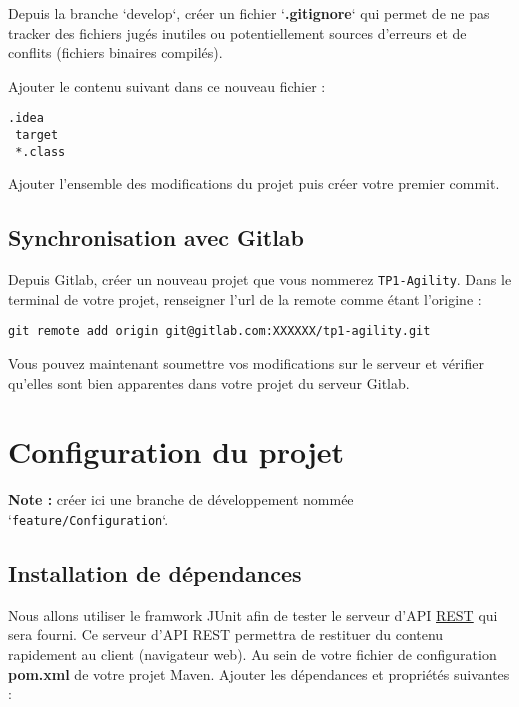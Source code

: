 \documentclass[11pt,a4paper,oneside]{article}
\begin{document}
Depuis la branche `develop`, créer un fichier `\textbf{.gitignore}` qui permet de ne pas tracker des fichiers jugés inutiles ou potentiellement sources d'erreurs et de conflits (fichiers binaires compilés).

\vspace{5mm}
Ajouter le contenu suivant dans ce nouveau fichier :

\begin{lstlisting}[style=custombash]
 .idea
 target
 *.class
\end{lstlisting}

Ajouter l'ensemble des modifications du projet puis créer votre premier commit.


\subsection{Synchronisation avec Gitlab}

Depuis Gitlab, créer un nouveau projet que vous nommerez \texttt{TP1-Agility}. Dans le terminal de votre projet, renseigner l'url de la remote comme étant l'origine :

\begin{lstlisting}[style=custombash]
 git remote add origin git@gitlab.com:XXXXXX/tp1-agility.git
\end{lstlisting}

\vspace{5mm}
Vous pouvez maintenant soumettre vos modifications sur le serveur et vérifier qu'elles sont bien apparentes dans votre projet du serveur Gitlab.


\section{Configuration du projet}

\textbf{Note :} créer ici une branche de développement nommée `\texttt{feature/Configuration}`.

\subsection{Installation de dépendances}

Nous allons utiliser le framwork JUnit afin de tester le serveur d'API \href{https://fr.wikipedia.org/wiki/Representational_state_transfer}{REST} qui sera fourni. Ce serveur d'API REST permettra de restituer du contenu rapidement au client (navigateur web). Au sein de votre fichier de configuration \textbf{pom.xml} de votre projet Maven. Ajouter les dépendances et propriétés suivantes :
\end{document}
